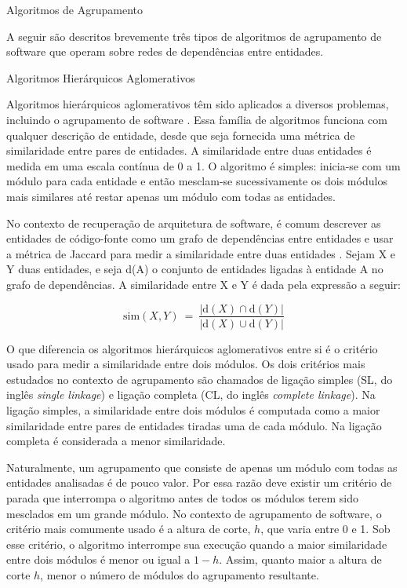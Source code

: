 \begin{chapter}{Algoritmos de Agrupamento} \label{cap:agrupamento}

A seguir são descritos brevemente três tipos de algoritmos de agrupamento de software que operam sobre redes de dependências entre entidades. %

\begin{section}{Algoritmos Hierárquicos Aglomerativos}

Algoritmos hierárquicos aglomerativos têm sido aplicados a diversos problemas, incluindo o agrupamento de software \cite{Anquetil1999,Maqbool2007}. Essa família de algoritmos funciona com qualquer descrição de entidade, desde que seja fornecida uma métrica de similaridade entre pares de entidades. A similaridade entre duas entidades é medida em uma escala contínua de 0 a 1. O algoritmo é simples: inicia-se com um módulo para cada entidade e então mesclam-se sucessivamente os dois módulos mais similares até restar apenas um módulo com todas as entidades.

No contexto de recuperação de arquitetura de software, é comum descrever as entidades de código-fonte como um grafo de dependências entre entidades e usar a métrica de Jaccard para medir a similaridade entre duas entidades \cite{Anquetil1999}. Sejam X e Y duas entidades, e seja d(A) o conjunto de entidades ligadas à entidade A no grafo de dependências. A similaridade entre X e Y é dada pela expressão a seguir:

$$
\mathrm{sim}(X, Y) ~=~ \frac{|\mathrm{d}(X) \cap \mathrm{d}(Y)|}{|\mathrm{d}(X) \cup \mathrm{d}(Y)|}
$$

O que diferencia os algoritmos hierárquicos aglomerativos entre si é o critério usado para medir a similaridade entre dois módulos. Os dois critérios mais estudados no contexto de agrupamento são chamados de ligação simples (SL, do inglês \emph{single linkage}) e ligação completa (CL, do inglês \emph{complete linkage}). Na ligação simples, a similaridade entre dois módulos é computada como a maior similaridade entre pares de entidades tiradas uma de cada módulo. Na ligação completa é considerada a menor similaridade.

Naturalmente, um agrupamento que consiste de apenas um módulo com todas as entidades analisadas é de pouco valor. Por essa razão deve existir um critério de parada que interrompa o algoritmo antes de todos os módulos terem sido mesclados em um grande módulo. No contexto de agrupamento de software, o critério mais comumente usado é a altura de corte, $h$, que varia entre 0 e 1. Sob esse critério, o algoritmo interrompe sua execução quando a maior similaridade entre dois módulos é menor ou igual a $1 - h$. Assim, quanto maior a altura de corte $h$, menor o número de módulos do agrupamento resultante.
	

\end{section}
\end{chapter}
